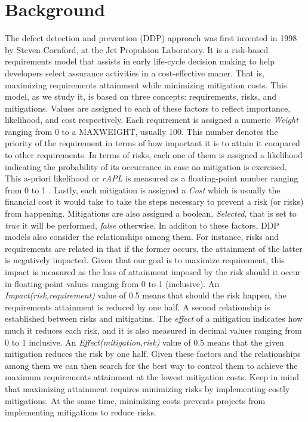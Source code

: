 \section{Background}
The defect detection and prevention (DDP) approach was first invented in 1998 by Steven Cornford, at the Jet Propulsion Laboratory. It is a risk-based requirements model that assists in early life-cycle decision making to help developers select assurance activities in a cost-effective maner. That is, maximizing requirements attainment while minimizing mitigation costs.
This model, as we study it, is based on three concepts: requirements, risks, and mitigations. Values are assigned to each of these factors to reflect importance, likelihood, and cost respectively.
Each requirement is assigned a numeric \textit{Weight} ranging from 0 to a MAXWEIGHT, usually 100. This number denotes the priority of the requirement in terms of how important it is to attain it compared to other requirements. In terms of risks, each one of them is assigned a likelihood indicating the probability of its occurrance in case no mitigation is exercised. This a-priori likelihood or \textit{rAPL} is measured as a floating-point number ranging from 0 to 1 . Lastly, each mitigation is assigned a \textit{Cost} which is usually the financial cost it would take to take the steps necessary to prevent a risk (or risks) from happening. Mitigations are also assigned a boolean, \textit{Selected}, that is set to \textit{true} it will be performed, \textit{false} otherwise. 
In additon to these factors, DDP models also consider the relationships among them. For instance, risks and requirements are related in that if the former occurs, the attainment of the latter is negatively impacted. Given that our goal is to maximize requirement, this impact is measured as the loss of attainment imposed by the risk should it occur in floating-point values ranging from 0 to 1 (inclusive). An \textit{Impact(risk,requirement)} value of 0.5 means that should the risk happen, the requirements attainment is reduced by one half. A second relationship is established between risks and mitigatins. The \textit{effect} of a mitigation indicates how much it reduces each risk, and it is also measured in decimal values ranging from 0 to 1 inclusive. An \textit{Effect(mitigation,risk)} value of 0.5 means that the given mitigation reduces the risk by one half.
Given these factors and the relationships among them we can then search for the best way to control them to achieve the maximum requirements attainment at the lowest mitigation costs. Keep in mind that maximizing attainment requires minimizing risks by implementing costly mitigations. At the same time, minimizing costs prevents projects from implementing mitigations to reduce risks.